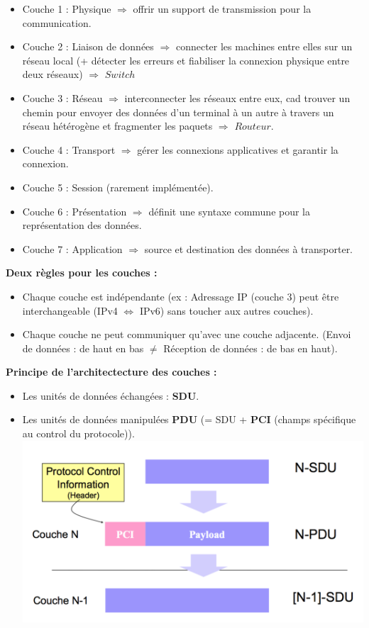 \documentclass[a4paper,9pt, twocolumn]{article}
\begin{document}
\begin{itemize}
\begin{center}
		\end{center}
		\item Couche 1 : Physique $\Longrightarrow$ offrir un support de transmission pour la communication.
		\item Couche 2 : Liaison de données $\Longrightarrow$ connecter les machines entre elles sur un réseau local (+ détecter les erreurs et fiabiliser la connexion physique entre deux réseaux) $\Longrightarrow$ $Switch$
		\item Couche 3 : Réseau $\Longrightarrow$ interconnecter les réseaux entre eux, cad trouver un chemin pour envoyer des données d'un terminal à un autre à travers un réseau hétérogène et fragmenter les paquets $\Longrightarrow$ $Routeur$.
		\item Couche 4 : Transport $\Longrightarrow$ gérer les connexions applicatives et garantir la connexion.
		\item Couche 5 : Session (rarement implémentée).
		\item Couche 6 : Présentation $\Longrightarrow$ définit une syntaxe commune pour la représentation des données.
		\item Couche 7 : Application $\Longrightarrow$ source et destination des données à transporter.
	\end{itemize}

	\textbf{Deux règles pour les couches : }
	\begin{itemize}
		\item Chaque couche est indépendante (ex : Adressage IP (couche 3) peut être interchangeable (IPv4 $\Leftrightarrow$ IPv6) sans toucher aux autres couches).
		\item Chaque couche ne peut communiquer qu'avec une couche adjacente. (Envoi de données : de haut en bas $\neq$ Réception de données : de bas en haut).
	\end{itemize}

	\textbf{Principe de l'architectecture des couches :}
	\begin{itemize}
		\item Les unités de données échangées : \textbf{SDU}.
		\item Les unités de données manipulées \textbf{PDU} (= SDU + \textbf{PCI} (champs spécifique au control du protocole)).
			\includegraphics[scale=0.4]{PDU.png}
	\end{itemize}
	
\end{document}
